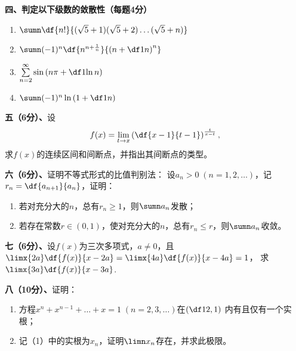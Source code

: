 {\bf 四、判定以下级数的敛散性（每题4分）}
\begin{enumerate}[(1)]
  \setlength{\itemindent}{1cm}
  \item $\sumn\df{n!}{{(\sqrt5+1)}{(\sqrt5+2)}\ldots{(\sqrt5+n)}}$
  \item $\sumn(-1)^n\df{n^{n+\frac1n}}{\left(n+\df1n\right)^n}$
  \item $\sum\limits_{n=2}^{\infty}\sin\left(n\pi+\df1{\ln n}\right)$
  \item $\sumn(-1)^n\ln\left(1+\df1n\right)$
\end{enumerate}


{\bf 五（6分）、}设
$$f(x)=\lim\limits_{t\to x}\left(\df{x-1}{t-1}\right)^{\frac{t}{x-t}},$$
求$f(x)$的连续区间和间断点，并指出其间断点的类型。

{\bf 六（6分）、}证明不等式形式的比值判别法：
设$a_n>0\;(n=1,2,\ldots)$，记$r_n=\df{a_{n+1}}{a_n}$，证明：
\begin{enumerate}[(1)]
  \setlength{\itemindent}{1cm}
  \item 若对充分大的$n$，总有$r_n\geq 1$，则$\sumn a_n$发散；
  \item 若存在常数$r\in(0,1)$，使对充分大的$n$，总有$r_n\leq r$，则$\sumn a_n$收敛。
\end{enumerate}

{\bf 七（6分）、}设$f(x)$为三次多项式，$a\ne 0$，且
$\limx{2a}\df{f(x)}{x-2a}=\limx{4a}\df{f(x)}{x-4a}=1$，
求$\limx{3a}\df{f(x)}{x-3a}$.

{\bf 八（10分）、}证明：
\begin{enumerate}[(1)]
  \setlength{\itemindent}{1cm}
  \item 方程$x^n+x^{n-1}+\ldots+x=1\;(n=2,3,\ldots)$在$\left(\df12,1\right)$
  内有且仅有一个实根；
  \item 记（1）中的实根为$x_n$，证明$\limn x_n$存在，并求此极限。
\end{enumerate}

